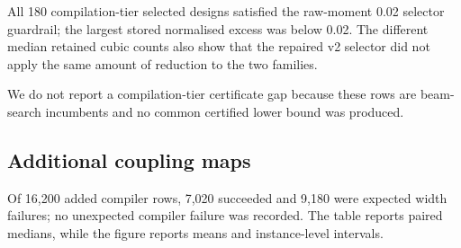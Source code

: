 \documentclass[a4paper,onecolumn,11pt,unpublished]{quantumarticle}
\theoremstyle{remark}
\begin{document}
\begin{table}[!htbp]
    \centering
    \small
    \caption{Median diagnostics for the 90 compilation-tier selective designs
    in each family.  Fibre risk is the normalised raw-moment excess used by the v2
    selector guardrail; the threshold is 0.02.  Time is selector runtime in seconds.}
    \label{tab:e2-selector-diagnostics}

\end{table}
All 180 compilation-tier selected designs satisfied the raw-moment 0.02
selector guardrail; the
largest stored normalised excess was below 0.02.  The different median retained
cubic counts also show that the repaired v2 selector did not apply the same amount
of reduction to the two families.

We do not report a compilation-tier
certificate gap because these rows are beam-search incumbents and no common
certified lower bound was produced.

\FloatBarrier
\subsection{Additional coupling maps}
\label{app:results-connectivity}

Of 16,200 added compiler rows, 7,020 succeeded and 9,180 were expected width
failures; no unexpected compiler failure was recorded. The table reports
paired medians, while the figure reports means and instance-level intervals.
\end{document}
